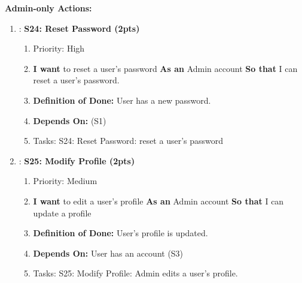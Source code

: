 \textbf{Admin-only Actions:}
\begin{enumerate}
    \item: \textbf{S24: Reset Password (2pts)}
    \begin{enumerate}
        \item Priority: High 
        \item \textbf{I want} to reset a user's password \textbf{As an} Admin account \textbf{So that} I can reset a user's password.
        \item \textbf{Definition of Done:} User has a new password.
        \item \textbf{Depends On:} (S1)
        \item Tasks: S24: Reset Password: reset a user's password
    \end{enumerate}

    \item: \textbf{S25: Modify Profile (2pts)}
    \begin{enumerate}
        \item Priority: Medium
        \item \textbf{I want} to edit a user's profile \textbf{As an} Admin account \textbf{So that} I can update a profile
        \item \textbf{Definition of Done:} User's profile is updated.
        \item \textbf{Depends On:} User has an account (S3)
        \item Tasks: S25: Modify Profile: Admin edits a user's profile.
    \end{enumerate}
\end{enumerate}

